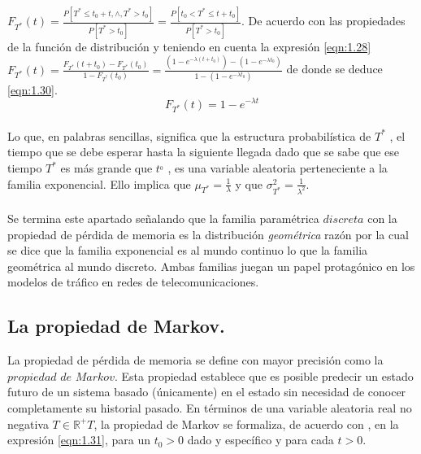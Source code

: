 $F_{T^{*}}\left ( t \right )=\frac {P\left [ T^{*}\leq t_{0}+t,\wedge ,T^{*}>t_{0} \right ]} {P\left[T^{*}>t_{0}\right ]}=\frac{P\left [ t_{0}<T^{*}\leq t+t_{0} \right ]}{P\left [ T^{*}>t_{0} \right ]}$. De acuerdo con las propiedades de la función de distribución y teniendo en cuenta la expresión \ref{eqn:1.28} 
\\
$F_{T^{*}} \left ( t \right )=\frac {F_{T^{*}}\left ( t+t_{0} \right )-F_{T^{*}}\left ( t_{0} \right )}  {1-F_{T^{*}}\left ( t_{0} \right )}=\frac {\left ( 1-e^{-\lambda \left ( t+t_{0} \right )} \right )-\left ( 1-e^{-\lambda t_{0}} \right )}   {1-\left ( 1-e^{-\lambda t_{0}} \right )}$ de donde se deduce \ref{eqn:1.30}.
\\

\begin{equation}
    F_{T^{*}}\left ( t \right )=1-e^{-\lambda t}
    \label{eqn:1.30}
\end{equation}
\\
Lo que, en palabras sencillas, significa que la estructura probabilística de $T^{*}$ , el tiempo que se debe esperar hasta la siguiente llegada dado que se sabe que ese tiempo $T^{*}$ es más grande que $t^{_{0}}$ , es una variable aleatoria perteneciente a la familia exponencial. Ello implica que $\mu _{T^{*}}=\frac{1}{\lambda }$ y que $\sigma _{T^{*}}^{2}=\frac{1}{\lambda ^{2}}$.
\\\\
Se termina este apartado señalando que la familia paramétrica $discreta$ con la propiedad de pérdida de memoria es la distribución {\em geométrica} razón por la cual se dice que la familia exponencial es al mundo continuo lo que la familia geométrica al mundo discreto. Ambas familias juegan un papel protagónico en los modelos de tráfico en redes de telecomunicaciones.






\subsection{La propiedad de Markov.}
La propiedad de pérdida de memoria se define con mayor precisión como la $propiedad$ $de$ $Markov$. Esta propiedad establece que es posible predecir un estado futuro de un sistema basado (únicamente) en el estado sin necesidad de conocer completamente su historial pasado. En términos de una variable aleatoria real no negativa $ T\in\mathbb{R}^{+}T $, la propiedad de Markov se formaliza, de acuerdo con \cite{kleinrock1975}, en la expresión \ref{eqn:1.31}, para un $t_{0}>0$ dado y específico y para cada $t>0$.

